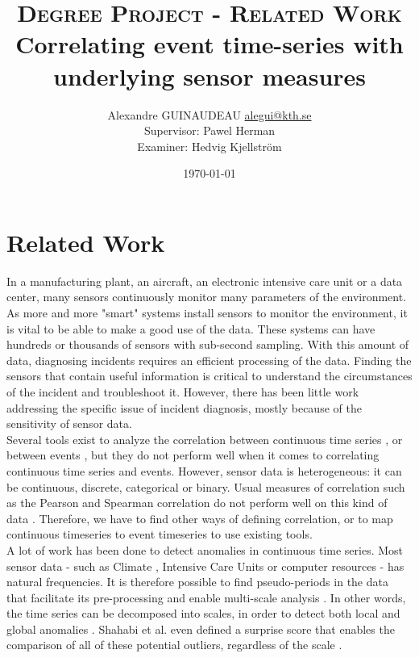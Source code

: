 \documentclass[12pt,a4paper]{article}
\title{\textsc{Degree Project - Related Work} \\ Correlating event time-series with underlying sensor measures}
\author{Alexandre GUINAUDEAU \href{mailto:alegui@kth.se}{alegui@kth.se}\\
Supervisor: Pawel Herman\\
Examiner: Hedvig Kjellstr{\"o}m}
\date{\today}
\begin{document}
\maketitle

\newpage

\section*{Related Work}

In a manufacturing plant, an aircraft, an electronic intensive care unit or a data center, many sensors continuously monitor many parameters of the environment. As more and more "smart" systems install sensors to monitor the environment, it is vital to be able to make a good use of the data.
These systems can have hundreds or thousands of sensors with sub-second sampling.
With this amount of data, diagnosing incidents requires an efficient processing of the data.
Finding the sensors that contain useful information is critical to understand the circumstances of the incident and troubleshoot it. However, there has been little work addressing the specific issue of incident diagnosis, mostly because of the sensitivity of sensor data.\\

Several tools exist to analyze the correlation between continuous time series \cite{tool-continuous}, or between events \cite{tool-event1, tool-event2, tool-event3}, but they do not perform well when it comes to correlating continuous time series and events. However, sensor data is heterogeneous: it can be continuous, discrete, categorical or binary.
Usual measures of correlation such as the Pearson and Spearman correlation do not perform well on this kind of data \cite{incident-diagnosis}. Therefore, we have to find other ways of defining correlation, or to map continuous timeseries to event timeseries to use existing tools.\\

A lot of work has been done to detect anomalies in continuous time series. Most sensor data - such as Climate \cite{climate}, Intensive Care Units \cite{icu} or computer resources \cite{incident-diagnosis} - has natural frequencies.
It is therefore possible to find pseudo-periods in the data that facilitate its pre-processing and enable multi-scale analysis \cite{multiscale-timeseries}.
In other words, the time series can be decomposed into scales, in order to detect both local \cite{anomaly-1, anomaly-2, anomaly-3} and global anomalies \cite{lof, global-local-outliers}.
Shahabi et al. even defined a surprise score that enables the comparison of all of these potential outliers, regardless of the scale \cite{multilevel-surprise}.
\end{document}
